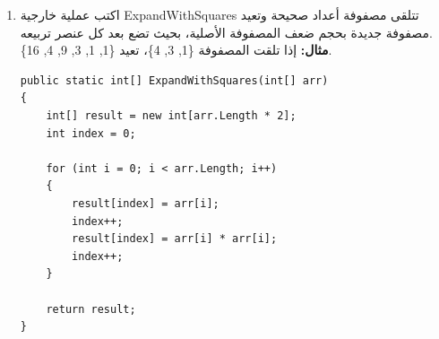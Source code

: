 \documentclass[14pt]{extarticle}
\begin{document}
\begin{enumerate}[itemsep=3em]
\begin{boxSolution}
\begin{english}
\begin{verbatim}
    int count = 0;
    for (int i = 0; i < arr.Length; i++)
    {
        if (arr[i] == maxVal)
            count++;
    }
    return count;
}
    \end{verbatim}
    \end{english}
    \end{boxSolution}
    \fi

    \item
    اكتب عملية خارجية \textenglish{ExpandWithSquares} تتلقى مصفوفة أعداد صحيحة وتعيد مصفوفة جديدة بحجم ضعف المصفوفة الأصلية، بحيث تضع بعد كل عنصر تربيعه.\\
    \textbf{مثال:} إذا تلقت المصفوفة \textenglish{\{1, 3, 4\}}، تعيد \textenglish{\{1, 1, 3, 9, 4, 16\}}.
    \ifwithsols
    \begin{boxSolution}
    \begin{english}
    \begin{verbatim}
public static int[] ExpandWithSquares(int[] arr)
{
    int[] result = new int[arr.Length * 2];
    int index = 0;

    for (int i = 0; i < arr.Length; i++)
    {
        result[index] = arr[i];
        index++;
        result[index] = arr[i] * arr[i];
        index++;
    }

    return result;
}
    \end{verbatim}
    \end{english}
    \end{boxSolution}
    \fi


\end{enumerate}
\end{document}
